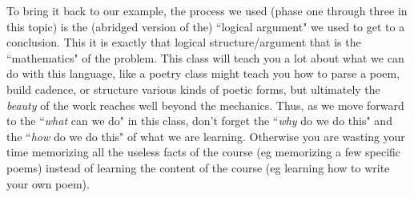 \documentclass{ximera}
\begin{document}
To bring it back to our example, the process we used (phase one through three in this topic) is the (abridged version of the) ``logical argument" we used to get to a conclusion. This it is exactly that logical structure/argument that is the ``mathematics" of the problem. This class will teach you a lot about what we can do with this language, like a poetry class might teach you how to parse a poem, build cadence, or structure various kinds of poetic forms, but ultimately the \textit{beauty} of the work reaches well beyond the mechanics. Thus, as we move forward to the ``\textit{what} can we do" in this class, don't forget the ``\textit{why} do we do this" and the ``\textit{how} do we do this" of what we are learning. Otherwise you are wasting your time memorizing all the useless facts of the course (eg memorizing a few specific poems) instead of learning the content of the course (eg learning how to write your own poem).
\end{document}

